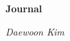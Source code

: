 \thispagestyle{empty}

\begin{center}
	\vfill
    \vspace*{0.4\textheight}

	\Huge
	\bf{Journal}
    
	\Large
	\it{Daewoon Kim}
	
    \normalsize
    
\end{center}